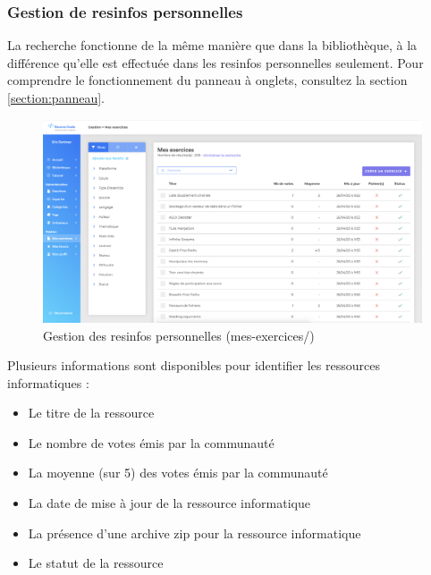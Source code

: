 \subsubsection{Gestion de \glspl{resinfo} personnelles}
\label{section:gestionResInfo}

La recherche fonctionne de la même manière que dans la bibliothèque, à la différence qu'elle est effectuée dans les \glspl{resinfo} personnelles seulement. Pour comprendre le fonctionnement du panneau à onglets, consultez la section \ref{section:panneau}.

\begin{figure}[H]
    \includegraphics[width=\textwidth,height=\textheight,keepaspectratio]{images/client/gestion-exercices.png}
    \centering
    \caption[SourceCode : gestion des \glspl{resinfo} personnelles]{Gestion des \glspl{resinfo} personnelles (mes-exercices/)}
\end{figure}

Plusieurs informations sont disponibles pour identifier les ressources informatiques :

\begin{itemize}
    \item Le titre de la ressource
    \item Le nombre de votes émis par la communauté
    \item La moyenne (sur 5) des votes émis par la communauté
    \item La date de mise à jour de la ressource informatique
    \item La présence d'une archive zip pour la ressource informatique
    \item Le statut de la ressource
\end{itemize}




